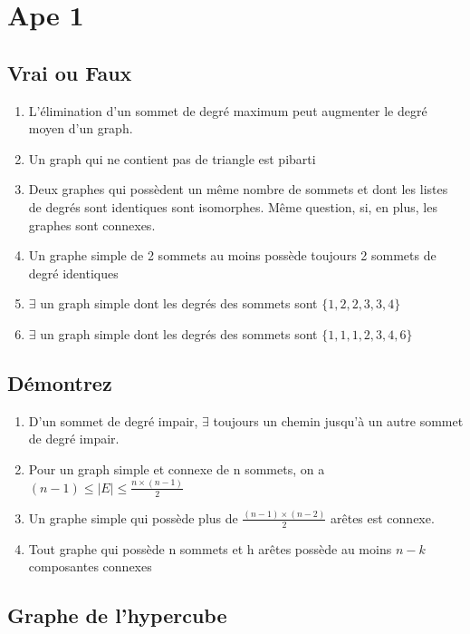 \section{Ape 1}

\subsection{Vrai ou Faux}
\begin{enumerate}
	\item{L'élimination d'un sommet de degré maximum peut augmenter le degré moyen d'un graph.}
	\item{Un graph qui ne contient pas de triangle est pibarti}
	\item{Deux graphes qui possèdent un même nombre de sommets et dont les listes de degrés sont identiques sont isomorphes. Même question, si, en plus, les graphes sont connexes.}
	\item{Un graphe simple de 2 sommets au moins possède toujours 2 sommets de degré identiques}
	\item{$\exists$ un graph simple dont les degrés des sommets sont $\{1,2,2,3,3,4\}$}
	\item{$\exists$ un graph simple dont les degrés des sommets sont $\{1,1,1,2,3,4,6\}$}	
\end{enumerate}

\subsection{Démontrez}
\begin{enumerate}
\item{D'un sommet de degré impair, $\exists$ toujours un chemin jusqu'à un autre sommet de degré impair.}
\item{Pour un graph simple et connexe de n sommets, on a $(n-1) \leq |E| \leq \frac{n \times (n-1)}{2}$}
\item{Un graphe simple qui possède plus de $\frac{(n-1) \times (n-2)}{2}$ arêtes est connexe.}
\item{Tout graphe qui possède n sommets et h arêtes possède au moins $n-k$ composantes connexes}
\end{enumerate}

\subsection{Graphe de l'hypercube}
